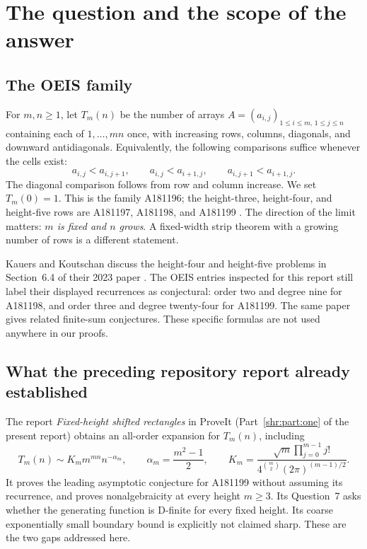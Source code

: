 \documentclass[11pt,letterpaper]{article}
\numberwithin{equation}{section}
\theoremstyle{definition}
\newcommand{\1}{\mathbf 1}
\begin{document}
\section{The question and the scope of the answer}
\label{shr:bp:sec:scope}

\subsection{The OEIS family}
For $m,n\ge1$, let $T_m(n)$ be the number of arrays
$A=(a_{i,j})_{1\le i\le m,\,1\le j\le n}$ containing each of
$1,\ldots,mn$ once, with increasing rows, columns, diagonals, and downward
antidiagonals. Equivalently, the following comparisons suffice whenever
the cells exist:
\begin{equation}
 a_{i,j}<a_{i,j+1},\qquad
 a_{i,j}<a_{i+1,j},\qquad
 a_{i,j+1}<a_{i+1,j}.
 \label{shr:bp:eq:poset}
\end{equation}
The diagonal comparison follows from row and column increase.
We set $T_m(0)=1$. This is the family A181196; the height-three, height-four,
and height-five rows are A181197, A181198, and A181199
\cite{oeis196,oeis197,oeis198,oeis199}.
The direction of the limit matters: \emph{$m$ is fixed and $n$ grows}.
A fixed-width strip theorem with a growing number of rows is a different
statement.

Kauers and Koutschan discuss the height-four and height-five problems in
Section~6.4 of their 2023 paper \cite{KK}. The OEIS entries inspected for
this report still label their displayed recurrences as conjectural:
order two and degree nine for A181198, and order three and degree twenty-four
for A181199. The same paper gives related finite-sum conjectures. These
specific formulas are not used anywhere in our proofs.

\subsection{What the preceding repository report already established}
The report \emph{Fixed-height shifted rectangles} in ProveIt
(Part~\ref{shr:part:one} of the present report) obtains an all-order expansion for $T_m(n)$, including
\begin{equation}
 T_m(n)\sim K_m m^{mn}n^{-\alpha_m},\qquad
 \alpha_m=\frac{m^2-1}{2},\qquad
 K_m=\frac{\sqrt m\prod_{j=0}^{m-1}j!}
 {4^{\binom m2}(2\pi)^{(m-1)/2}}.
 \label{shr:bp:eq:priorleading}
\end{equation}
It proves the leading asymptotic conjecture for A181199 without assuming
its recurrence, and proves nonalgebraicity at every height $m\ge3$.
Its Question~7 asks whether the generating function is D-finite for every
fixed height. Its coarse exponentially small boundary bound is explicitly
not claimed sharp. These are the two gaps addressed here.
\end{document}
